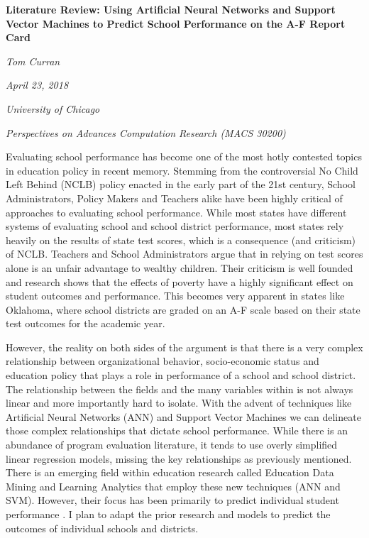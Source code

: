 \documentclass[12pt,a4paper]{article}
\begin{document}
\begin{titlepage}
	\begin{center}
		\Large\textbf{Literature Review: Using Artificial Neural Networks and Support Vector Machines to Predict School Performance on the A-F Report Card}\linebreak
		
		\large\textit{Tom Curran}
		
		\large\textit{April 23, 2018}
		
		\large\textit{University of Chicago}
		
		\large\textit{Perspectives on Advances Computation Research (MACS 30200)}
		
	\end{center}
\end{titlepage}
\doublespacing

		Evaluating school performance has become one of the most hotly contested topics in education policy in recent memory. Stemming from the controversial No Child Left Behind (NCLB) policy enacted in the early part of the 21st century, School Administrators, Policy Makers and Teachers alike have been highly critical of approaches to evaluating school performance. While most states have different systems of evaluating school and school district performance, most states rely heavily on the results of state test scores, which is a consequence (and criticism) of NCLB. Teachers and School Administrators argue that in relying on test scores alone is an unfair advantage to wealthy children. Their criticism is well founded and research shows that the effects of poverty have a highly significant effect on student outcomes and performance. This becomes very apparent in states like Oklahoma, where school districts are graded on an A-F scale based on their state test outcomes for the academic year. 

However, the reality on both sides of the argument is that there is a very complex relationship between organizational behavior, socio-economic status and education policy that plays a role in performance of a school and school district. The relationship between the fields and the many variables within is not always linear and more importantly hard to isolate. With the advent of techniques like Artificial Neural Networks (ANN) and Support Vector Machines we can delineate those complex relationships that dictate school performance. While there is an abundance of program evaluation literature, it tends to use overly simplified linear regression models, missing the key relationships as previously mentioned. There is an emerging field within education research called Education Data Mining and Learning Analytics that employ these new techniques (ANN and SVM). However, their focus has been primarily to predict individual student performance \cite{huebner}. I plan to adapt the prior research and models to predict the outcomes of individual schools and districts.
\end{document}
